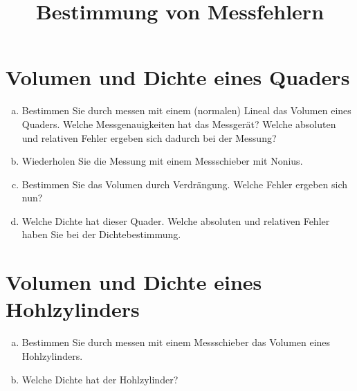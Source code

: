 \documentclass[12pt,a4paper, twosite]{article}
\author{}
\date{}
\title{Bestimmung von Messfehlern}
\begin{document}
\maketitle

\section{Volumen und Dichte eines Quaders}
\begin{enumerate}[a)]
	\item Bestimmen Sie durch messen mit einem (normalen) Lineal das Volumen eines Quaders.
	Welche Messgenauigkeiten hat das Messgerät? Welche absoluten und relativen Fehler ergeben sich dadurch bei der Messung?
	\item Wiederholen Sie die Messung mit einem Messschieber mit Nonius.
	\item Bestimmen Sie das Volumen durch Verdrängung. Welche Fehler ergeben sich nun?
	\item Welche Dichte hat dieser Quader. Welche absoluten und relativen Fehler haben Sie bei der Dichtebestimmung.
\end{enumerate}

\section{Volumen und Dichte eines Hohlzylinders}
\begin{enumerate}[a)]
	\item Bestimmen Sie durch messen mit einem Messschieber das Volumen eines Hohlzylinders.
	\item Welche Dichte hat der Hohlzylinder?
\end{enumerate}
\end{document}

